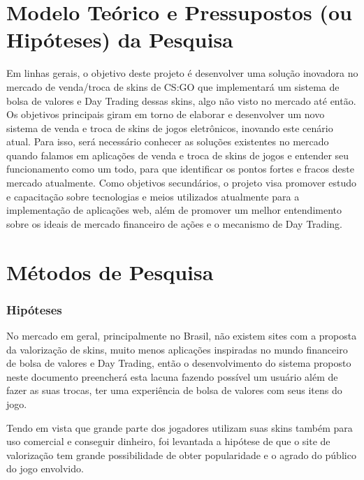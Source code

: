 
\chapter{Modelo Teórico e Pressupostos (ou Hipóteses) da Pesquisa}

Em linhas gerais, o objetivo deste projeto é desenvolver uma solução inovadora no mercado 
de venda/troca de skins de CS:GO que implementará um sistema de bolsa de valores e 
Day Trading dessas skins, algo não visto no mercado até então.
Os objetivos principais giram em torno de elaborar e desenvolver um novo sistema 
de venda e troca de skins de jogos eletrônicos, inovando este cenário atual. 
Para isso, será necessário conhecer as soluções existentes no mercado quando falamos em 
aplicações de venda e troca de skins de jogos e entender seu funcionamento como um todo, 
para que identificar os pontos fortes e fracos deste mercado atualmente.
Como objetivos secundários, o projeto visa promover estudo e capacitação sobre tecnologias 
e meios utilizados atualmente para a implementação de aplicações web, além de promover um 
melhor entendimento sobre os ideais de mercado financeiro de ações e o mecanismo de 
Day Trading.


\chapter{Métodos de Pesquisa}

 \subsection{Hipóteses}
    No mercado em geral, principalmente no Brasil, não existem sites com a proposta da valorização de skins, muito menos aplicações inspiradas no mundo financeiro de bolsa de valores e Day Trading, então o desenvolvimento do sistema proposto neste documento preencherá esta lacuna fazendo possível um usuário além de fazer as suas trocas, ter uma experiência de bolsa de valores com seus itens do jogo. 
    
    Tendo em vista que grande parte dos jogadores utilizam suas skins também para uso comercial e conseguir dinheiro, foi levantada a hipótese de que o site de valorização tem grande possibilidade de obter popularidade e o agrado do público do jogo envolvido.

